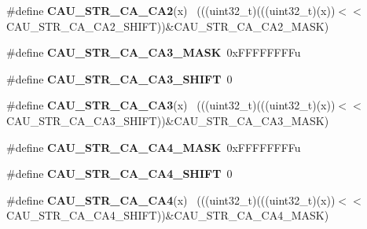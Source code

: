 \begin{DoxyCompactItemize}
\item 
\hypertarget{group___c_a_u___register___masks_gadf655eba0c68e7f82c35672ba1772e57}{}\#define {\bfseries C\+A\+U\+\_\+\+S\+T\+R\+\_\+\+C\+A\+\_\+\+C\+A2}(x)                                            ~(((uint32\+\_\+t)(((uint32\+\_\+t)(x))$<$$<$C\+A\+U\+\_\+\+S\+T\+R\+\_\+\+C\+A\+\_\+\+C\+A2\+\_\+\+S\+H\+I\+F\+T))\&C\+A\+U\+\_\+\+S\+T\+R\+\_\+\+C\+A\+\_\+\+C\+A2\+\_\+\+M\+A\+S\+K)\label{group___c_a_u___register___masks_gadf655eba0c68e7f82c35672ba1772e57}

\item 
\hypertarget{group___c_a_u___register___masks_ga52281a79b1f2f28a74652e8934c3e8e7}{}\#define {\bfseries C\+A\+U\+\_\+\+S\+T\+R\+\_\+\+C\+A\+\_\+\+C\+A3\+\_\+\+M\+A\+S\+K}~0x\+F\+F\+F\+F\+F\+F\+F\+Fu\label{group___c_a_u___register___masks_ga52281a79b1f2f28a74652e8934c3e8e7}

\item 
\hypertarget{group___c_a_u___register___masks_gac71abdf9ef9823b10c9d3e57bcc3e197}{}\#define {\bfseries C\+A\+U\+\_\+\+S\+T\+R\+\_\+\+C\+A\+\_\+\+C\+A3\+\_\+\+S\+H\+I\+F\+T}~0\label{group___c_a_u___register___masks_gac71abdf9ef9823b10c9d3e57bcc3e197}

\item 
\hypertarget{group___c_a_u___register___masks_ga3eaf0a6611fa44f7a48907f6ecb3c7bd}{}\#define {\bfseries C\+A\+U\+\_\+\+S\+T\+R\+\_\+\+C\+A\+\_\+\+C\+A3}(x)                                            ~(((uint32\+\_\+t)(((uint32\+\_\+t)(x))$<$$<$C\+A\+U\+\_\+\+S\+T\+R\+\_\+\+C\+A\+\_\+\+C\+A3\+\_\+\+S\+H\+I\+F\+T))\&C\+A\+U\+\_\+\+S\+T\+R\+\_\+\+C\+A\+\_\+\+C\+A3\+\_\+\+M\+A\+S\+K)\label{group___c_a_u___register___masks_ga3eaf0a6611fa44f7a48907f6ecb3c7bd}

\item 
\hypertarget{group___c_a_u___register___masks_ga201a5c7621a22e47519189370bcdb769}{}\#define {\bfseries C\+A\+U\+\_\+\+S\+T\+R\+\_\+\+C\+A\+\_\+\+C\+A4\+\_\+\+M\+A\+S\+K}~0x\+F\+F\+F\+F\+F\+F\+F\+Fu\label{group___c_a_u___register___masks_ga201a5c7621a22e47519189370bcdb769}

\item 
\hypertarget{group___c_a_u___register___masks_gaf22d48103a45462f4f1c412212b28941}{}\#define {\bfseries C\+A\+U\+\_\+\+S\+T\+R\+\_\+\+C\+A\+\_\+\+C\+A4\+\_\+\+S\+H\+I\+F\+T}~0\label{group___c_a_u___register___masks_gaf22d48103a45462f4f1c412212b28941}

\item 
\hypertarget{group___c_a_u___register___masks_ga09f7cc2a823a0b7c9e62af77ab970855}{}\#define {\bfseries C\+A\+U\+\_\+\+S\+T\+R\+\_\+\+C\+A\+\_\+\+C\+A4}(x)                                            ~(((uint32\+\_\+t)(((uint32\+\_\+t)(x))$<$$<$C\+A\+U\+\_\+\+S\+T\+R\+\_\+\+C\+A\+\_\+\+C\+A4\+\_\+\+S\+H\+I\+F\+T))\&C\+A\+U\+\_\+\+S\+T\+R\+\_\+\+C\+A\+\_\+\+C\+A4\+\_\+\+M\+A\+S\+K)\label{group___c_a_u___register___masks_ga09f7cc2a823a0b7c9e62af77ab970855}


\end{DoxyCompactItemize}
